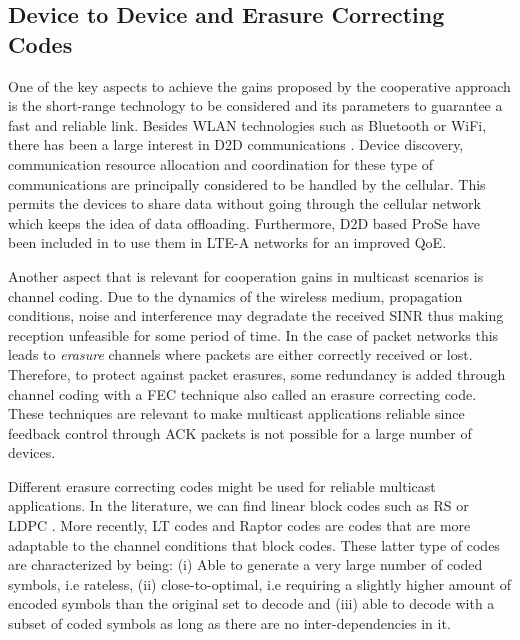 \subsection{Device to Device and Erasure Correcting Codes}
\label{sec:d2d_erasure_codes}
One of the key aspects to achieve the gains proposed by the cooperative approach is the short-range technology to be considered and its parameters to guarantee a fast and reliable link. Besides \ac{WLAN} technologies such as Bluetooth or \ac{WiFi}, there has been a large interest in \ac{D2D} communications \cite{lin2013comprehensive,asadi2014survey,feng2014device,tehrani2014device}. Device discovery, communication resource allocation and coordination for these type of communications are principally considered to be handled by the cellular. This permits the devices to share data without going through the cellular network which keeps the idea of data offloading. Furthermore, \ac{D2D} based \ac{ProSe} have been included in \cite{3gpp2012prose} to use them in \ac{LTE-A} networks for an improved \ac{QoE}.

Another aspect that is relevant for cooperation gains in multicast scenarios is channel coding. Due to the dynamics of the wireless medium, propagation conditions, noise and interference may degradate the received \ac{SINR} thus making reception unfeasible for some period of time. In the case of packet networks this leads to \textit{erasure} channels where packets are either correctly received or lost. Therefore, to protect against packet erasures, some redundancy is added through channel coding with a \ac{FEC} technique also called an erasure correcting code. These techniques are relevant to make multicast applications reliable since feedback control through \ac{ACK} packets is not possible for a large number of devices.

Different erasure correcting codes might be used for reliable multicast applications. In the literature, we can find linear block codes such as \ac{RS} \cite{reed1960polynomial} or \ac{LDPC} \cite{gallager1962low}. More recently, \ac{LT} codes \cite{luby2002lt} and Raptor codes \cite{shokrollahi2006raptor} are codes that are more adaptable to the channel conditions that block codes. These latter type of codes are characterized by being: (i) Able to generate a very large number of coded symbols, i.e rateless, (ii) close-to-optimal, i.e requiring a slightly higher amount of encoded symbols than the original set to decode and (iii) able to decode with a subset of coded symbols as long as there are no inter-dependencies in it.

